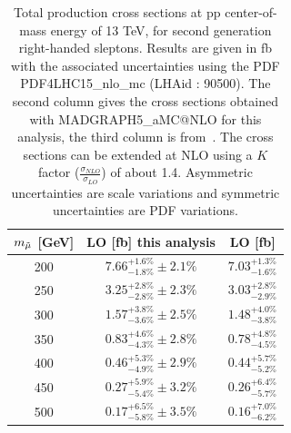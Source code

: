 \documentclass{cernatlasnote}
\begin{document}
\begin{appendices}
\begin{table}
    \centering
    \caption{Total production cross sections at pp center-of-mass  energy of 13 TeV, for second generation right-handed sleptons. Results are given in fb with the associated uncertainties using the PDF PDF4LHC15\_nlo\_mc (LHAid : 90500). The second column gives the cross sections obtained with MADGRAPH5\_aMC@NLO for this analysis, the third column is from~\cite{Fuks_2014}. The cross sections can be extended at NLO using a $K$ factor ($\frac{\sigma_{NLO}}{\sigma_{LO}}$) of about 1.4. Asymmetric uncertainties are scale variations and symmetric uncertainties are PDF variations.} 
    \label{tab:RIGHTXS}
    \smallskip
    \begin{tabular}{ ccc }
         $m_{\Tilde{\mu}}$ [GeV]  & LO [fb] this analysis & LO [fb] \cite{Fuks_2014} \\
         \hline
         200  & $7.66^{+1.6\%}_{-1.8\%} \pm 2.1\% $  & $7.03^{+1.3\%}_{-1.6\%}$  \\
         250  & $3.25^{+2.8\%}_{-2.8\%} \pm 2.3\%$   & $3.03^{+2.8\%}_{-2.9\%}$  \\
         300  & $1.57^{+3.8\%}_{-3.6\%} \pm 2.5\%$   & $1.48^{+4.0\%}_{-3.8\%}$  \\
         350  & $0.83^{+4.6\%}_{-4.3\%} \pm 2.8\% $  & $0.78^{+4.8\%}_{-4.5\%}$  \\
         400  & $0.46^{+5.3\%}_{-4.9\%} \pm 2.9\%$   & $0.44^{+5.7\%}_{-5.2\%}$ \\
         450  & $0.27^{+5.9\%}_{-5.4\%} \pm 3.2\%$   & $0.26^{+6.4\%}_{-5.7\%}$  \\
         500  & $0.17^{+6.5\%}_{-5.8\%} \pm 3.5\%$   & $0.16^{+7.0\%}_{-6.2\%}$ \\
    \end{tabular}
\end{table}


\end{appendices}
\end{document}
